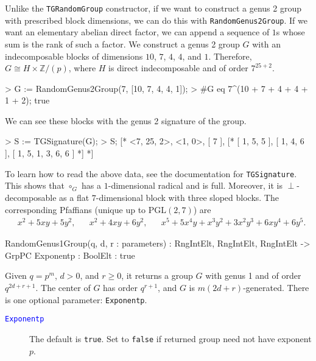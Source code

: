 \documentclass{documentation}
\begin{document}
\begin{example}[PrescribedBlocks]
    Unlike the \texttt{TGRandomGroup} constructor, if we want to construct a genus 2 group with prescribed block dimensions, we can do this with \texttt{RandomGenus2Group}. If we want an elementary abelian direct factor, we can append a sequence of $1$s whose sum is the rank of such a factor. We construct a genus 2 group $G$ with an indecomposable blocks of dimensions $10$, $7$, $4$, $4$, and $1$. Therefore, $G\cong H\times \mathbb{Z}/(p)$, where $H$ is direct indecomposable and of order $7^{25+2}$. 
\begin{code}
> G := RandomGenus2Group(7, [10, 7, 4, 4, 1]);
> #G eq 7^(10 + 7 + 4 + 4 + 1 + 2);
true        
\end{code}

    We can see these blocks with the genus 2 signature of the group. 
\begin{code}
> S := TGSignature(G);
> S;
[* <7, 25, 2>, <1, 0>,
    [ 7 ],
    [*
        [ 1, 5, 5 ],
        [ 1, 4, 6 ],
        [ 1, 5, 1, 3, 6, 6 ]
    *]
*] 
\end{code}

To learn how to read the above data, see the documentation for
\texttt{TGSignature}. This shows that $\circ_G$ has a $1$-dimensional radical
and is full. Moreover, it is $\perp$-decomposable as a flat $7$-dimensional
block with three sloped blocks. The corresponding Pfaffians (unique up to
$\mathrm{PGL}(2, 7)$) are 
\begin{align*}
    & x^2 + 5xy + 5y^2, & & x^2 + 4xy + 6y^2, & & x^5 + 5x^4y + x^3y^2 + 3x^2y^3 + 6xy^4 + 6y^5.
\end{align*}
\end{example}

\begin{intrinsics}
RandomGenus1Group(q, d, r : parameters) : RngIntElt, RngIntElt, RngIntElt -> GrpPC
    Exponentp : BoolElt : true
\end{intrinsics}

Given $q=p^m$, $d>0$, and $r\geq 0$, it returns a group $G$ with genus 1 and of order $q^{2d+r+1}$.
The center of $G$ has order $q^{r+1}$, and $G$ is $m(2d+r)$-generated.
There is one optional parameter: \texttt{Exponentp}. 

\begin{description}
\item[\textcolor{blue}{\tt Exponentp}]
The default is \texttt{true}.
Set to \texttt{false} if returned group need not have exponent $p$.  
\end{description}
\end{document}
